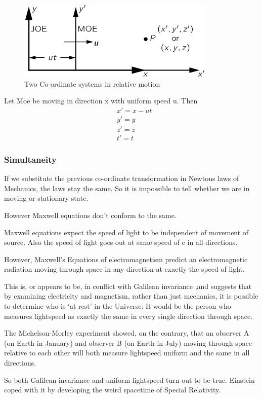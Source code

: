\documentclass{beamer}
\theoremstyle{plain}
\theoremstyle{definition}
\theoremstyle{remark}
\numberwithin{equation}{section}
\numberwithin{figure}{section}
\numberwithin{theorem}{section}
\begin{document}
		\begin{frame}[shrink]
			\begin{figure}\footnotemark[1]
				\centering
				\includegraphics[width=0.7\linewidth]{figures/screenshot001}
				\caption[Two Co-ordinate systems in relative motion]{Two Co-ordinate systems in relative motion}
				\label{fig:screenshot001}
			\end{figure}
			Let Moe be moving in direction x with uniform speed u.
			Then 
			\begin{align}
				& x' = x - ut \\
				& y' = y \\
				& z' = z \\
				& t' = t
			\end{align}
		\end{frame}
		
		
		\begin{frame}[shrink]
			\frametitle{Simultaneity}
		If we substitute the previous co-ordinate transformation in Newtons laws of Mechanics, the laws stay the same. So it is impossible to tell whether we are in moving or stationary state.
		
		However Maxwell equations don't conform to the same.
		
		Maxwell equations expect the speed of light to be independent of movement of source. Also the speed of light goes out at same speed of c in all directions.
		
		However, Maxwell’s Equations of electromagnetism predict an electromagnetic radiation moving through space in any direction at exactly the speed of light.
		
		This is, or appears to be, in conflict with Galilean invariance ,and suggests that by examining electricity and magnetism, rather than just mechanics, it is possible to determine who is ‘at rest’ in the Universe. It would be the person who measures lightspeed as exactly the same in every single direction through space.\footnotemark[2]
		
		The Michelson-Morley experiment showed, on the contrary, that an observer A (on Earth in January) and observer B (on Earth in July) moving through space relative to each other will both measure lightspeed uniform and the same in all directions.
		
		So both Galilean invariance and uniform lightspeed turn out to be true. Einstein coped with it by developing the weird spacetime of Special Relativity.
		
		\end{frame}
		
\end{document}
